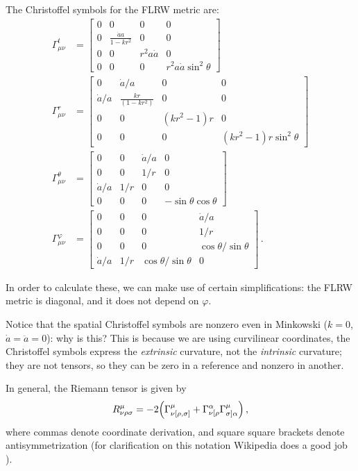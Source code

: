 \documentclass[main.tex]{subfiles}
\begin{document}
The Christoffel symbols for the FLRW metric are: 
%
\begin{align}
\Gamma^{t}_{\mu \nu } &= \left[\begin{array}{cccc}
0 & 0 & 0 & 0 \\ 
0 & \frac{\dot{a}a}{1-kr^2} & 0 & 0 \\ 
0 & 0 & r^2a \dot{a} & 0 \\ 
0 & 0 & 0 & r^2 a \dot{a} \sin^2\theta 
\end{array}\right] \\
\Gamma^{r}_{\mu \nu } &= \left[\begin{array}{cccc}
0 & \dot{a} / a & 0 & 0 \\ 
\dot{a} / a & \frac{kr}{(1-kr^2)} & 0 & 0 \\ 
0 & 0 & (kr^2-1)r & 0 \\ 
0 & 0 & 0 & (kr^2-1)r \sin^2\theta 
\end{array}\right] \\
\Gamma^{\theta }_{\mu \nu } &= \left[\begin{array}{cccc}
 0 & 0 & \dot{a} / a & 0 \\ 
0 & 0 & 1 / r & 0 \\ 
\dot{a} / a & 1/r & 0 & 0 \\ 
0 & 0 & 0 & - \sin \theta \cos \theta 
\end{array}\right] \\
\Gamma^{\varphi }_{\mu \nu } &= \left[\begin{array}{cccc}
0 & 0 & 0 & \dot{a} / a \\ 
0 & 0 & 0 & 1/r \\ 
0 & 0 & 0 & \cos \theta  /\sin \theta  \\ 
\dot{a} /a  & 1/r & \cos \theta  /\sin \theta  & 0
\end{array}\right]
\,.
\end{align}

In order to calculate these, we can make use of certain simplifications: the FLRW metric is diagonal, and it does not depend on \(\varphi \).

Notice that the spatial Christoffel symbols are nonzero even in Minkowski (\(k=0\), \(\dot{a} = \ddot{a} =  0\)): why is this?
This is because we are using curvilinear coordinates, the Christoffel symbols express the \emph{extrinsic} curvature, not the \emph{intrinsic} curvature; they are not tensors, so they can be zero in a reference and nonzero in another. 

In general, the Riemann tensor is given by 
%
\begin{align}
R^{\mu }_{\nu \rho \sigma } = -2 \qty(\Gamma^{\mu }_{\nu [\rho , \sigma ]} + \Gamma^{\alpha }_{\nu [\rho } \Gamma^{\mu }_{\sigma ] \alpha })
\,,
\end{align}
%
where commas denote coordinate derivation, and square square brackets denote antisymmetrization (for clarification on this notation Wikipedia does a good job \cite{AntisymmetricTensor2019}). 
\end{document}
